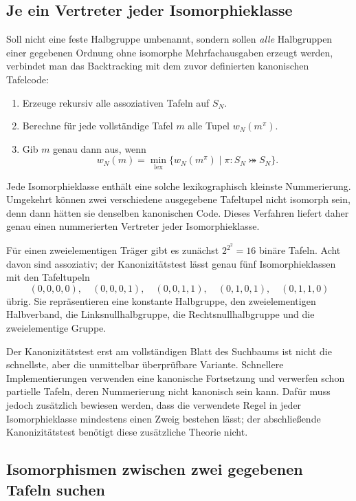 \documentclass[main.tex]{subfiles}
\begin{document}
\subsection{Je ein Vertreter jeder Isomorphieklasse}

Soll nicht eine feste Halbgruppe umbenannt, sondern sollen \emph{alle}
Halbgruppen einer gegebenen Ordnung ohne isomorphe Mehrfachausgaben erzeugt
werden, verbindet man das Backtracking mit dem zuvor definierten kanonischen
Tafelcode:
\begin{enumerate}
  \item Erzeuge rekursiv alle assoziativen Tafeln auf \(S_N\).
  \item Berechne für jede vollständige Tafel \(m\) alle Tupel
    \(w_N(m^\pi)\).
  \item Gib \(m\) genau dann aus, wenn
    \[
      w_N(m)
      =
      \min_{\mathrm{lex}}
      \{w_N(m^\pi)\mid \pi\colon S_N\bij S_N\}.
    \]
\end{enumerate}
Jede Isomorphieklasse enthält eine solche lexikographisch kleinste
Nummerierung.  Umgekehrt können zwei verschiedene ausgegebene Tafeltupel
nicht isomorph sein, denn dann hätten sie denselben kanonischen Code.  Dieses
Verfahren liefert daher genau einen nummerierten Vertreter jeder
Isomorphieklasse.

Für einen zweielementigen Träger gibt es zunächst
\(2^{2^2}=16\) binäre Tafeln.  Acht davon sind assoziativ; der
Kanonizitätstest lässt genau fünf Isomorphieklassen mit den Tafeltupeln
\[
  (0,0,0,0),\quad (0,0,0,1),\quad (0,0,1,1),\quad
  (0,1,0,1),\quad (0,1,1,0)
\]
übrig.  Sie repräsentieren eine konstante Halbgruppe, den zweielementigen
Halbverband, die Linksnullhalbgruppe, die Rechtsnullhalbgruppe und die
zweielementige Gruppe.

Der Kanonizitätstest erst am vollständigen Blatt des Suchbaums ist nicht die
schnellste, aber die unmittelbar überprüfbare Variante.  Schnellere
Implementierungen verwenden eine kanonische Fortsetzung und verwerfen schon
partielle Tafeln, deren Nummerierung nicht kanonisch sein kann.  Dafür muss
jedoch zusätzlich bewiesen werden, dass die verwendete Regel in jeder
Isomorphieklasse mindestens einen Zweig bestehen lässt; der abschließende
Kanonizitätstest benötigt diese zusätzliche Theorie nicht.


\subsection{Isomorphismen zwischen zwei gegebenen Tafeln suchen}
\end{document}
